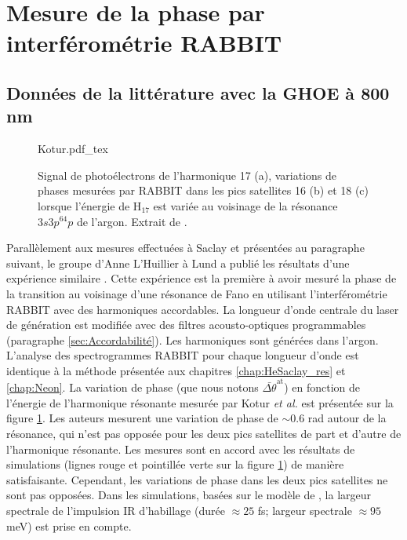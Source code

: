 \section{Mesure de la phase par interférométrie RABBIT}
\subsection{Données de la littérature avec la GHOE à 800 nm}
\begin{figure}[ht]
\centering
\def\svgwidth{0.5\textwidth}
{Kotur.pdf_tex}
\caption{Signal de photoélectrons de l'harmonique 17 (a), variations de phases mesurées par RABBIT dans les pics satellites 16 (b) et 18 (c) lorsque l'énergie de H$_{17}$ est variée au voisinage de la résonance $3s3p^64p$ de l'argon. Extrait de .}
\label{fig:Kotur}
\end{figure}

Parallèlement aux mesures effectuées à Saclay et présentées au paragraphe suivant, le groupe d'Anne L'Huillier à Lund a publié les résultats d'une expérience similaire . Cette expérience est la première à avoir mesuré la phase de la transition au voisinage d'une résonance de Fano en utilisant l'interférométrie RABBIT avec des harmoniques accordables. La longueur d'onde centrale du laser de génération est modifiée avec des filtres acousto-optiques programmables (paragraphe \ref{sec:Accordabilité}). Les harmoniques sont générées dans l'argon. L'analyse des spectrogrammes RABBIT pour chaque longueur d'onde est identique à la méthode présentée aux chapitres \ref{chap:HeSaclay_res} et \ref{chap:Neon}. La variation de phase (que nous notons $\bar{\Delta \theta}^{\text{at}}$) en fonction de l'énergie de l'harmonique résonante mesurée par Kotur \textit{et al.} est présentée sur la figure \ref{fig:Kotur}. Les auteurs mesurent une variation de phase de $\sim 0.6$ rad autour de la résonance, qui n'est pas opposée pour les deux pics satellites de part et d'autre de l'harmonique résonante. Les mesures sont en accord avec les résultats de simulations (lignes rouge et pointillée verte sur la figure \ref{fig:Kotur}) de manière satisfaisante. Cependant, les variations de phase dans les deux pics satellites ne sont pas opposées. Dans les simulations, basées sur le modèle de , la largeur spectrale de l'impulsion IR d'habillage (durée $\approx 25$ fs; largeur spectrale $\approx 95$ meV) est prise en compte.

